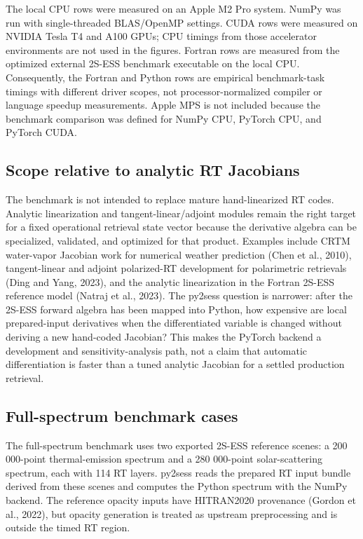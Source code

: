 \documentclass[gmd, manuscript]{copernicus}
\begin{document}
The local CPU rows were measured on an Apple M2 Pro system.  NumPy was run with
single-threaded BLAS/OpenMP settings.  CUDA rows were measured on NVIDIA Tesla T4 and
A100 GPUs; CPU timings from those accelerator environments are not used in the figures.
Fortran rows are measured from the optimized external 2S-ESS benchmark executable on
the local CPU.  Consequently, the Fortran and Python rows are empirical benchmark-task
timings with different driver scopes, not processor-normalized compiler or language
speedup measurements.  Apple MPS is not included because the benchmark comparison was
defined for NumPy CPU, PyTorch CPU, and PyTorch CUDA.

\subsection{Scope relative to analytic RT Jacobians}

The benchmark is not intended to replace mature hand-linearized RT codes.  Analytic
linearization and tangent-linear/adjoint modules remain the right target for a fixed
operational retrieval state vector because the derivative algebra can be specialized,
validated, and optimized for that product.  Examples include CRTM water-vapor
Jacobian work for numerical weather prediction (Chen et al., 2010),
tangent-linear and adjoint polarized-RT development for polarimetric retrievals
(Ding and Yang, 2023), and the analytic
linearization in the Fortran 2S-ESS reference model (Natraj et al., 2023).  The py2sess
question is narrower: after the 2S-ESS forward algebra has been mapped into Python,
how expensive are local prepared-input derivatives when the differentiated variable is
changed without deriving a new hand-coded Jacobian?  This makes the PyTorch backend a
development and sensitivity-analysis path, not a claim that automatic differentiation
is faster than a tuned analytic Jacobian for a settled production retrieval.

\subsection{Full-spectrum benchmark cases}

The full-spectrum benchmark uses two exported 2S-ESS reference scenes: a
200 000-point thermal-emission spectrum and a 280 000-point solar-scattering spectrum,
each with 114 RT layers.  py2sess reads the prepared RT input bundle derived from these
scenes and computes the Python spectrum with the NumPy backend.  The reference opacity
inputs have HITRAN2020 provenance (Gordon et al., 2022), but opacity generation is
treated as upstream preprocessing and is outside the timed RT region.
\end{document}
